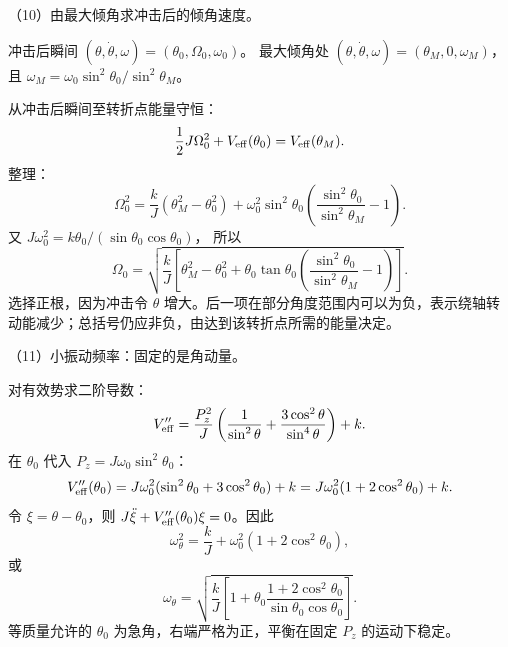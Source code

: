 \documentclass[12pt,a4paper,fontset=fandol]{ctexart}
\begin{document}
\begin{center}
\begin{minipage}{\linewidth}
\centering\begingroup
{}
\ifdim\wd\diagrambox>.88\linewidth
\sbox{\diagrambox}{\resizebox{.88\linewidth}{!}{\usebox{\diagrambox}}}
\fi
\ifdim\ht\diagrambox>.40\textheight
\resizebox{!}{.40\textheight}{\usebox{\diagrambox}}
\else\usebox{\diagrambox}\fi
\par{}
\endgroup\end{minipage}
\end{center}

（10）由最大倾角求冲击后的倾角速度。

冲击后瞬间 \((\theta,\dot\theta,\omega)=(\theta_0,\Omega_0,\omega_0)\)。
最大倾角处 \((\theta,\dot\theta,\omega)=(\theta_M,0,\omega_M)\)，且
\(\omega_M=\omega_0\sin^2\theta_0/\sin^2\theta_M\)。

从冲击后瞬间至转折点能量守恒： \[
\frac12J\Omega_0^2+V_{\rm eff}(\theta_0)
=V_{\rm eff}(\theta_M).
\] 整理： \[
\Omega_0^2=
\frac{k}{J}(\theta_M^2-\theta_0^2)
+\omega_0^2\sin^2\theta_0
\left(\frac{\sin^2\theta_0}{\sin^2\theta_M}-1\right).
\] 又 \(J\omega_0^2=k\theta_0/(\sin\theta_0\cos\theta_0)\)， 所以 \[
\boxed{\Omega_0=
\sqrt{\frac{k}{J}
\left[
\theta_M^2-\theta_0^2+
\theta_0\tan\theta_0
\left(\frac{\sin^2\theta_0}{\sin^2\theta_M}-1\right)
\right]}.}\tag{6.11}
\] 选择正根，因为冲击令 \(\theta\)
增大。后一项在部分角度范围内可以为负，表示绕轴转动能减少；总括号仍应非负，由达到该转折点所需的能量决定。

（11）小振动频率：固定的是角动量。

对有效势求二阶导数： \[
V_{\rm eff}''=
\frac{P_z^2}{J}
\left(\frac1{\sin^2\theta}
+\frac{3\cos^2\theta}{\sin^4\theta}\right)+k.
\] 在 \(\theta_0\) 代入 \(P_z=J\omega_0\sin^2\theta_0\)： \[
V_{\rm eff}''(\theta_0)
=J\omega_0^2(\sin^2\theta_0+3\cos^2\theta_0)+k
=J\omega_0^2(1+2\cos^2\theta_0)+k.
\] 令 \(\xi=\theta-\theta_0\)，则
\(J\ddot\xi+V_{\rm eff}''(\theta_0)\xi=0\)。因此 \[
\boxed{\omega_\theta^2=
\frac{k}{J}+\omega_0^2(1+2\cos^2\theta_0),}\tag{6.12}
\] 或 \[
\boxed{\omega_\theta=
\sqrt{\frac{k}{J}
\left[1+\theta_0
\frac{1+2\cos^2\theta_0}{\sin\theta_0\cos\theta_0}
\right]}.}\tag{6.13}
\] 等质量允许的 \(\theta_0\) 为急角，右端严格为正，平衡在固定 \(P_z\)
的运动下稳定。
\end{document}
